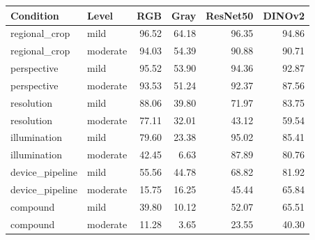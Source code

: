 \begin{tabular}{llrrrr}
\toprule
Condition & Level & RGB & Gray & ResNet50 & DINOv2 \\
\midrule
regional\_crop & mild & 96.52 & 64.18 & 96.35 & 94.86 \\
regional\_crop & moderate & 94.03 & 54.39 & 90.88 & 90.71 \\
perspective & mild & 95.52 & 53.90 & 94.36 & 92.87 \\
perspective & moderate & 93.53 & 51.24 & 92.37 & 87.56 \\
resolution & mild & 88.06 & 39.80 & 71.97 & 83.75 \\
resolution & moderate & 77.11 & 32.01 & 43.12 & 59.54 \\
illumination & mild & 79.60 & 23.38 & 95.02 & 85.41 \\
illumination & moderate & 42.45 & 6.63 & 87.89 & 80.76 \\
device\_pipeline & mild & 55.56 & 44.78 & 68.82 & 81.92 \\
device\_pipeline & moderate & 15.75 & 16.25 & 45.44 & 65.84 \\
compound & mild & 39.80 & 10.12 & 52.07 & 65.51 \\
compound & moderate & 11.28 & 3.65 & 23.55 & 40.30 \\
\bottomrule
\end{tabular}
